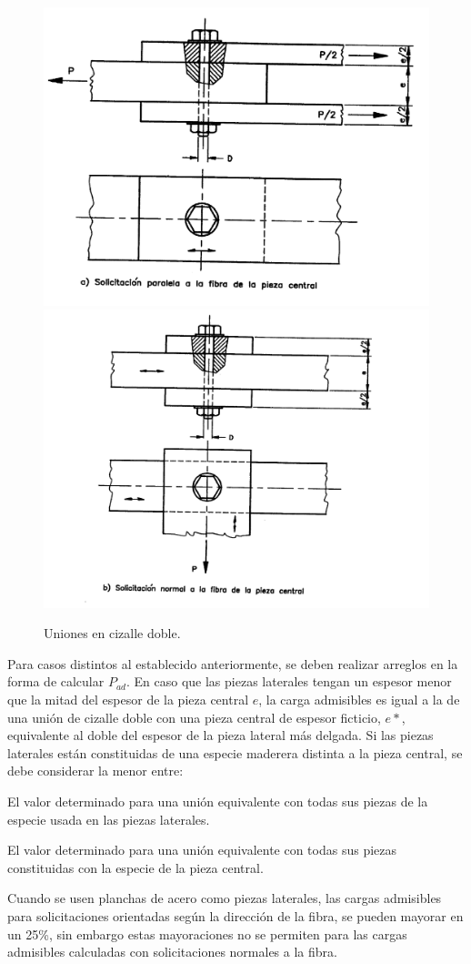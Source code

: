 \begin{figure}[H]
\centering
\includegraphics[width=0.5\linewidth, angle=1,origin=c]{Imagenes/figura_23A.pdf}%
\includegraphics[width=0.5\linewidth, angle=1,origin=c]{Imagenes/figura_23B.pdf}
\caption{Uniones en cizalle doble. \cite{nch1198}}
\label{fig:nch_23}
\end{figure}


Para casos distintos al establecido anteriormente, se deben realizar arreglos en la forma de calcular $P_{ad}$. En caso que las piezas laterales tengan un espesor menor que la mitad del espesor de la pieza central $e$, la carga admisibles es igual a la de una unión de cizalle doble con una pieza central de espesor ficticio, $e*$, equivalente al doble del espesor de la pieza lateral más delgada. Si las piezas laterales están constituidas de una especie maderera distinta a la pieza central, se debe considerar la menor entre:
\begin{itemize*}
	\item El valor determinado para una unión equivalente con todas sus piezas de la especie usada en las piezas laterales.
	\item El valor determinado para una unión equivalente con todas sus piezas constituidas con la especie de la pieza central.
\end{itemize*}

Cuando se usen planchas de acero como piezas laterales, las cargas admisibles para solicitaciones orientadas según la dirección de la fibra, se pueden mayorar en un 25\%, sin embargo estas mayoraciones no se permiten para las cargas admisibles calculadas con solicitaciones normales a la fibra.

